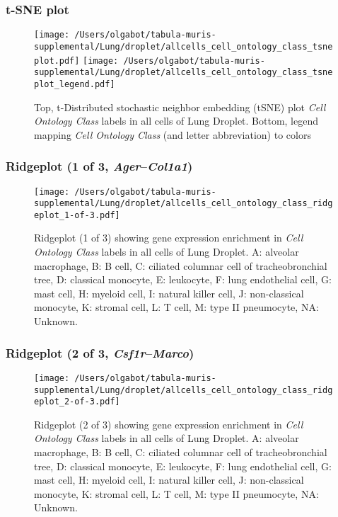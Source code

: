\clearpage
\subsubsection{t-SNE plot}
\begin{figure}[h]
\centering
\texttt{[image: /Users/olgabot/tabula-muris-supplemental/Lung/droplet/allcells\_cell\_ontology\_class\_tsneplot.pdf]}
\texttt{[image: /Users/olgabot/tabula-muris-supplemental/Lung/droplet/allcells\_cell\_ontology\_class\_tsneplot\_legend.pdf]}
\caption{Top, t-Distributed stochastic neighbor embedding (tSNE) plot  \emph{Cell Ontology Class} labels in all cells of Lung Droplet. Bottom, legend mapping \emph{Cell Ontology Class} (and letter abbreviation) to colors}
\end{figure}


\clearpage

\subsubsection{Ridgeplot (1 of 3, \emph{Ager}--\emph{Col1a1})}
\begin{figure}[h]
\centering
\texttt{[image: /Users/olgabot/tabula-muris-supplemental/Lung/droplet/allcells\_cell\_ontology\_class\_ridgeplot\_1-of-3.pdf]}

\caption{ Ridgeplot (1 of 3)  showing gene expression enrichment in \emph{Cell Ontology Class} labels in all cells of Lung Droplet. A: alveolar macrophage, B: B cell, C: ciliated columnar cell of tracheobronchial tree, D: classical monocyte, E: leukocyte, F: lung endothelial cell, G: mast cell, H: myeloid cell, I: natural killer cell, J: non-classical monocyte, K: stromal cell, L: T cell, M: type II pneumocyte, NA: Unknown.}
\end{figure}


\clearpage

\subsubsection{Ridgeplot (2 of 3, \emph{Csf1r}--\emph{Marco})}
\begin{figure}[h]
\centering
\texttt{[image: /Users/olgabot/tabula-muris-supplemental/Lung/droplet/allcells\_cell\_ontology\_class\_ridgeplot\_2-of-3.pdf]}

\caption{ Ridgeplot (2 of 3)  showing gene expression enrichment in \emph{Cell Ontology Class} labels in all cells of Lung Droplet. A: alveolar macrophage, B: B cell, C: ciliated columnar cell of tracheobronchial tree, D: classical monocyte, E: leukocyte, F: lung endothelial cell, G: mast cell, H: myeloid cell, I: natural killer cell, J: non-classical monocyte, K: stromal cell, L: T cell, M: type II pneumocyte, NA: Unknown.}
\end{figure}


